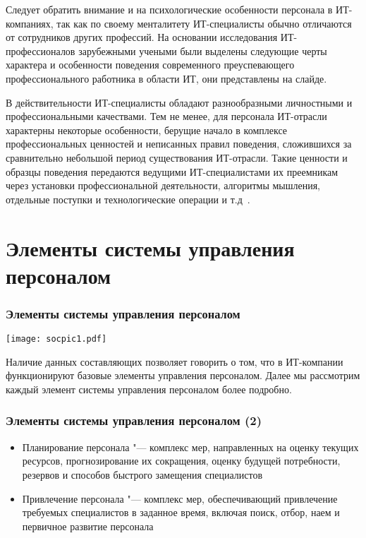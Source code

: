 \documentclass{../industrial-development}
\begin{document}
Следует обратить внимание и на психологические особенности персонала в ИТ-компаниях, так как по своему менталитету ИТ-специалисты обычно отличаются от сотрудников других профессий. На основании исследования ИТ-профессионалов зарубежными учеными были выделены следующие черты характера и особенности поведения современного преуспевающего профессионального работника в области ИТ, они представлены на слайде.

В действительности ИТ-специалисты обладают разнообразными личностными и профессиональными качествами. Тем не менее, для персонала ИТ-отрасли характерны некоторые особенности, берущие начало в комплексе профессиональных ценностей и неписанных правил поведения, сложившихся за сравнительно небольшой период существования ИТ-отрасли. Такие ценности и образцы поведения передаются ведущими ИТ-специалистами их преемникам через установки профессиональной деятельности, алгоритмы мышления, отдельные поступки и технологические операции и т.д~\cite{OsobenPoveden}. 

\section{Элементы системы управления персоналом}
\begin{frame} \frametitle{Элементы системы управления персоналом}
	
	\centerline{\texttt{[image: socpic1.pdf]}}
	
\end{frame}

\lecturenotes

Наличие данных составляющих позволяет говорить о том, что в ИТ-компании функционируют базовые элементы управления персоналом. Далее мы рассмотрим каждый элемент системы управления персоналом более подробно.

\begin{frame} \frametitle{Элементы системы управления персоналом (2)}
	
	\begin{itemize}
		\item \alert{Планирование персонала} "--- комплекс мер, направленных на оценку текущих ресурсов, прогнозирование их сокращения, оценку будущей потребности, резервов и способов быстрого замещения специалистов
		\item \alert{Привлечение персонала} "--- комплекс мер, обеспечивающий привлечение требуемых специалистов в заданное время, включая поиск, отбор, наем и первичное развитие персонала
	\end{itemize}
\end{frame}
\end{document}
